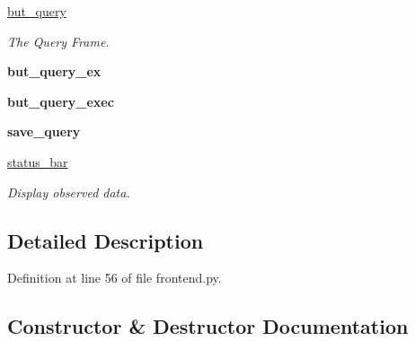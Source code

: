 \begin{DoxyCompactItemize}
\mbox{\label{classasamba_1_1frontend_1_1_g_u_i_addea3bc3e768466ce68e55f4c1bcb5ea}} 
\hyperlink{classasamba_1_1frontend_1_1_g_u_i_addea3bc3e768466ce68e55f4c1bcb5ea}{but\+\_\+query}
\begin{DoxyCompactList}\small\item\em The Query Frame. \end{DoxyCompactList}\item 
\mbox{\label{classasamba_1_1frontend_1_1_g_u_i_ae483448f532c86136af6c332c33528b8}} 
{\bfseries but\+\_\+query\+\_\+ex}
\item 
\mbox{\label{classasamba_1_1frontend_1_1_g_u_i_aeed8a8ab709d60ac0d5d9e1180be5aea}} 
{\bfseries but\+\_\+query\+\_\+exec}
\item 
\mbox{\label{classasamba_1_1frontend_1_1_g_u_i_a4d992d23ea956c881ee49406c5bbac6b}} 
{\bfseries save\+\_\+query}
\item 
\hyperlink{classasamba_1_1frontend_1_1_g_u_i_a05a2765e23aaed2a4380f7089f387dbd}{status\+\_\+bar}
\begin{DoxyCompactList}\small\item\em Display observed data. \end{DoxyCompactList}\end{DoxyCompactItemize}


\subsection{Detailed Description}


Definition at line 56 of file frontend.\+py.



\subsection{Constructor \& Destructor Documentation}
\mbox{\label{classasamba_1_1frontend_1_1_g_u_i_adff8117b4f723520f100119d38f9b567}} 
